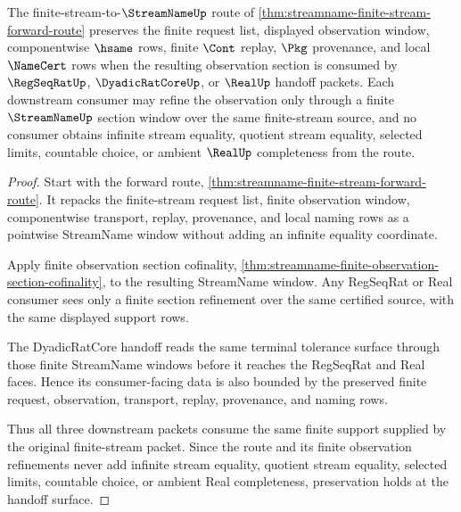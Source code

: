\begin{theorem}
\label{thm:streamname-finite-stream-forward-preservation}
The finite-stream-to-$\StreamNameUp$ route of \autoref{thm:streamname-finite-stream-forward-route} preserves the finite request list, displayed observation window, componentwise $\hsame$ rows, finite $\Cont$ replay, $\Pkg$ provenance, and local $\NameCert$ rows when the resulting observation section is consumed by $\RegSeqRatUp$, $\DyadicRatCoreUp$, or $\RealUp$ handoff packets. Each downstream consumer may refine the observation only through a finite $\StreamNameUp$ section window over the same finite-stream source, and no consumer obtains infinite stream equality, quotient stream equality, selected limits, countable choice, or ambient $\RealUp$ completeness from the route.
\end{theorem}
\begin{proof}
Start with the forward route, \autoref{thm:streamname-finite-stream-forward-route}. It repacks the finite-stream request list, finite observation window, componentwise transport, replay, provenance, and local naming rows as a pointwise StreamName window without adding an infinite equality coordinate.

Apply finite observation section cofinality, \autoref{thm:streamname-finite-observation-section-cofinality}, to the resulting StreamName window. Any RegSeqRat or Real consumer sees only a finite section refinement over the same certified source, with the same displayed support rows.

The DyadicRatCore handoff reads the same terminal tolerance surface through those finite StreamName windows before it reaches the RegSeqRat and Real faces. Hence its consumer-facing data is also bounded by the preserved finite request, observation, transport, replay, provenance, and naming rows.

Thus all three downstream packets consume the same finite support supplied by the original finite-stream packet. Since the route and its finite observation refinements never add infinite stream equality, quotient stream equality, selected limits, countable choice, or ambient Real completeness, preservation holds at the handoff surface.
\end{proof}

